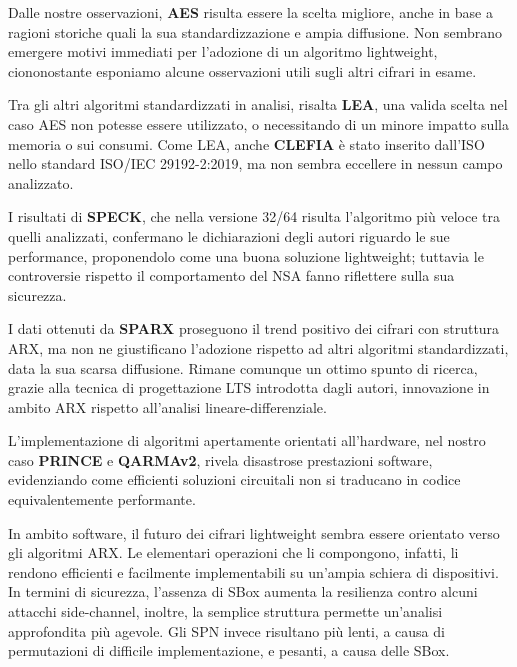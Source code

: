 \documentclass[target=bach,aauheader=,style=]{thud}
\begin{document}
Dalle nostre osservazioni, \textbf{AES} risulta essere la scelta migliore, anche in base a ragioni storiche quali la sua standardizzazione e ampia diffusione. Non sembrano emergere motivi immediati per l'adozione di un algoritmo lightweight, ciononostante esponiamo alcune osservazioni utili sugli altri cifrari in esame.

Tra gli altri algoritmi standardizzati in analisi, risalta \textbf{LEA}, una valida scelta nel caso AES non potesse essere utilizzato, o necessitando di un minore impatto sulla memoria o sui consumi. Come LEA, anche \textbf{CLEFIA} è stato inserito dall'ISO nello standard ISO/IEC 29192-2:2019, ma non sembra eccellere in nessun campo analizzato.

I risultati di \textbf{SPECK}, che nella versione 32/64 risulta l'algoritmo più veloce tra quelli analizzati, confermano le dichiarazioni degli autori riguardo le sue performance, proponendolo come una buona soluzione lightweight; tuttavia le controversie rispetto il comportamento del NSA fanno riflettere sulla sua sicurezza.

I dati ottenuti da \textbf{SPARX} proseguono il trend positivo dei cifrari con struttura ARX, ma non ne giustificano l'adozione rispetto ad altri algoritmi standardizzati, data la sua scarsa diffusione. Rimane comunque un ottimo spunto di ricerca, grazie alla tecnica di progettazione LTS introdotta dagli autori, innovazione in ambito ARX rispetto all'analisi lineare-differenziale.

L'implementazione di algoritmi apertamente orientati all'hardware, nel nostro caso \textbf{PRINCE} e \textbf{QARMAv2}, rivela disastrose prestazioni software, evidenziando come efficienti soluzioni circuitali non si traducano in codice equivalentemente performante.

In ambito software, il futuro dei cifrari lightweight sembra essere orientato verso gli algoritmi ARX. Le elementari operazioni che li compongono, infatti, li rendono efficienti e facilmente implementabili su un'ampia schiera di dispositivi. In termini di sicurezza, l'assenza di SBox aumenta la resilienza contro alcuni attacchi side-channel\cite{sparx}, inoltre, la semplice struttura permette un'analisi approfondita più agevole\cite{speck}.
Gli SPN invece risultano più lenti, a causa di permutazioni di difficile implementazione, e pesanti, a causa delle SBox.
\appendix

\end{document}
